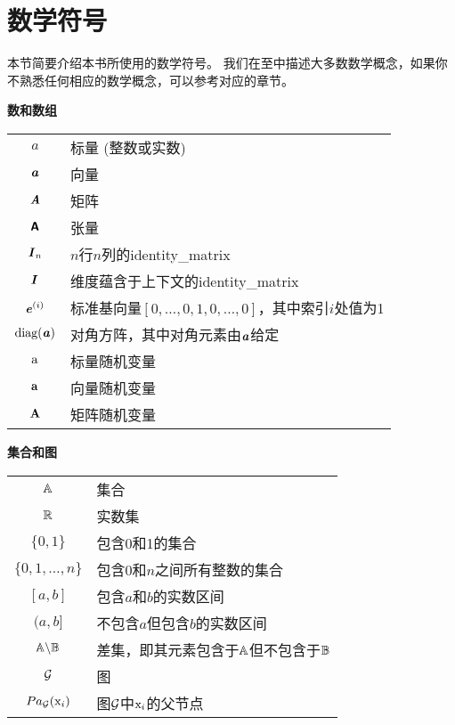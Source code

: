 \chapter*{数学符号}
\label{notation}



本节简要介绍本书所使用的数学符号。 
我们在至中描述大多数数学概念，如果你不熟悉任何相应的数学概念，可以参考对应的章节。

\vspace{\notationgap}
\begin{minipage}{\textwidth}
\centerline{\bf 数和数组}
\bgroup
\def\arraystretch{1.5}
\begin{tabular}{cp{3.25in}}
$\displaystyle a$ & 标量 (整数或实数) \\
$\displaystyle \boldsymbol{\mathit{a}}$ & 向量 \\
$\displaystyle \boldsymbol{\mathit{A}}$ & 矩阵 \\
$\displaystyle \textsf{\textbf{A}}$ & 张量 \\
$\displaystyle \boldsymbol{\mathit{I}}_n$ & $n$行$n$列的\gls{identity_matrix} \\
    $\displaystyle \boldsymbol{\mathit{I}}$ &  维度蕴含于上下文的\gls{identity_matrix} \\
$\displaystyle \boldsymbol{\mathit{e}}^{(i)}$ & 标准基向量$[0,\dots,0,1,0,\dots,0]$，其中索引$i$处值为1 \\ 
$\displaystyle \text{diag}(\boldsymbol{\mathit{a}})$ & 对角方阵，其中对角元素由$\boldsymbol{\mathit{a}}$给定 \\
$\displaystyle \mathrm{a}$ & 标量随机变量 \\
$\displaystyle \mathbf{a}$ & 向量随机变量 \\
$\displaystyle \boldsymbol{\mathrm{A}}$ & 矩阵随机变量 \\
\end{tabular}
\egroup
\end{minipage}

\vspace{\notationgap}
\begin{minipage}{\textwidth}
\centerline{\bf 集合和图}
\bgroup
\def\arraystretch{1.5}
\begin{tabular}{cp{3.25in}}
$\displaystyle \mathbb{A}$ & 集合 \\
$\displaystyle \mathbb{R}$ & 实数集 \\
$\displaystyle \{0, 1\}$ & 包含0和1的集合 \\
$\displaystyle \{0, 1, \dots, n \}$ & 包含$0$和$n$之间所有整数的集合 \\
$\displaystyle [a, b]$ & 包含$a$和$b$的实数区间 \\
$\displaystyle (a, b]$ & 不包含$a$但包含$b$的实数区间 \\
$\displaystyle \mathbb{A} \backslash \mathbb{B}$ & 差集，即其元素包含于$\mathbb{A}$但不包含于$\mathbb{B}$\\
$\displaystyle \mathcal{G}$ & 图 \\
$\displaystyle Pa_{\mathcal{G}}(\mathrm{x}_i)$ & 图$\mathcal{G}$中$\mathrm{x}_i$的父节点
\end{tabular}
\egroup
\end{minipage}

